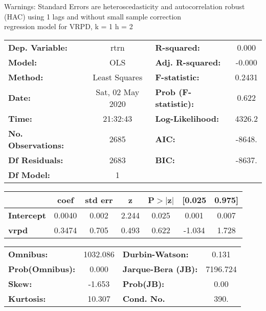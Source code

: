 Warnings: \newline
 [1] Standard Errors are heteroscedasticity and autocorrelation robust (HAC) using 1 lags and without small sample correction\\ 

regression model for VRPD, k = 1 h = 2\begin{center}
\begin{tabular}{lclc}
\toprule
\textbf{Dep. Variable:}    &       rtrn       & \textbf{  R-squared:         } &     0.000   \\
\textbf{Model:}            &       OLS        & \textbf{  Adj. R-squared:    } &    -0.000   \\
\textbf{Method:}           &  Least Squares   & \textbf{  F-statistic:       } &    0.2431   \\
\textbf{Date:}             & Sat, 02 May 2020 & \textbf{  Prob (F-statistic):} &    0.622    \\
\textbf{Time:}             &     21:32:43     & \textbf{  Log-Likelihood:    } &    4326.2   \\
\textbf{No. Observations:} &        2685      & \textbf{  AIC:               } &    -8648.   \\
\textbf{Df Residuals:}     &        2683      & \textbf{  BIC:               } &    -8637.   \\
\textbf{Df Model:}         &           1      & \textbf{                     } &             \\
\bottomrule
\end{tabular}
\begin{tabular}{lcccccc}
                   & \textbf{coef} & \textbf{std err} & \textbf{z} & \textbf{P$> |$z$|$} & \textbf{[0.025} & \textbf{0.975]}  \\
\midrule
\textbf{Intercept} &       0.0040  &        0.002     &     2.244  &         0.025        &        0.001    &        0.007     \\
\textbf{vrpd}      &       0.3474  &        0.705     &     0.493  &         0.622        &       -1.034    &        1.728     \\
\bottomrule
\end{tabular}
\begin{tabular}{lclc}
\textbf{Omnibus:}       & 1032.086 & \textbf{  Durbin-Watson:     } &    0.131  \\
\textbf{Prob(Omnibus):} &   0.000  & \textbf{  Jarque-Bera (JB):  } & 7196.724  \\
\textbf{Skew:}          &  -1.653  & \textbf{  Prob(JB):          } &     0.00  \\
\textbf{Kurtosis:}      &  10.307  & \textbf{  Cond. No.          } &     390.  \\
\bottomrule
\end{tabular}
\end{center}

